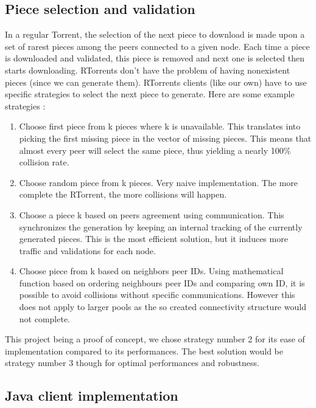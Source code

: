 \documentclass[a4paper]{article}
\begin{document}
{\subsection{Piece selection and validation}
In a regular Torrent, the selection of the next piece to download is made upon a set of rarest pieces among the peers connected to a given node. Each time a piece is downloaded and validated, this piece is removed and next one is selected then starts downloading. RTorrents don't have the problem of having nonexistent pieces (since we can generate them). RTorrents clients (like our own) have to use specific strategies to select the next piece to generate. Here are some example strategies :\vspace{2mm}

\begin{enumerate}
	\item Choose first piece from k pieces where k is unavailable. This translates into picking the first missing piece in the vector of missing pieces. This means that almost every peer will select the same piece, thus yielding a nearly  100\% collision rate.
	\item Choose random piece from k pieces. Very naive implementation. The more complete the RTorrent, the more collisions will happen.
	\item Choose a piece k based on peers agreement using communication. This synchronizes the generation by keeping an internal tracking of the currently generated pieces. This is the most efficient solution, but it induces more traffic and validations for each node.
	\item Choose piece from k based on neighbors peer IDs. Using mathematical function based on ordering neighbours peer IDs and comparing own ID, it is possible to avoid collisions without specific communications. However this does not apply to larger pools as the so created connectivity structure would not complete.
\end{enumerate}
\vspace{2mm}

This project being a proof of concept, we chose strategy number 2 for its ease of implementation compared to its performances. The best solution would be strategy number 3 though for optimal performances and robustness.\\

\subsection{Java client implementation}

}
\end{document}
